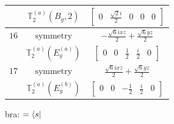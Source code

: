 \documentclass[fleqn,8pt,landscape]{jsarticle}
\begin{document}
\begin{longtable}{ccc}
$  $ & $ \mathbb{T}_{2}^{(a)}(B_{g},2) $ & $ \begin{bmatrix} 0 & \frac{\sqrt{2} i}{2} & 0 & 0 & 0 \end{bmatrix} $ \\ \hline
$ 16 $ & $ \text{symmetry} $ & $ - \frac{\sqrt{6} i x z}{2} + \frac{\sqrt{6} y z}{2} $ \\
$  $ & $ \mathbb{T}_{2}^{(a)}(E_{g}^{(a)}) $ & $ \begin{bmatrix} 0 & 0 & \frac{1}{2} & \frac{i}{2} & 0 \end{bmatrix} $ \\ \hline
$ 17 $ & $ \text{symmetry} $ & $ \frac{\sqrt{6} i x z}{2} + \frac{\sqrt{6} y z}{2} $ \\
$  $ & $ \mathbb{T}_{2}^{(a)}(E_{g}^{(b)}) $ & $ \begin{bmatrix} 0 & 0 & - \frac{1}{2} & \frac{i}{2} & 0 \end{bmatrix} $ \\ \hline
\end{longtable}
bra: $=\bra{s}$
\end{document}
